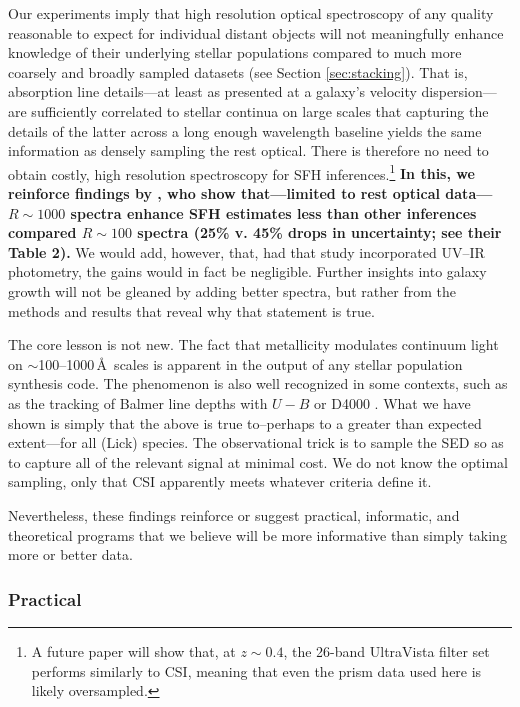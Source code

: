 \documentclass[a4paper,fleqn,usenatbib]{mnras}
\newcommand{\bfr}{\bf\color{red}}
\begin{document}
Our experiments imply that high resolution optical spectroscopy of any quality reasonable
to expect for individual distant objects will not meaningfully 
enhance knowledge of their underlying stellar populations compared to much more coarsely and broadly 
sampled datasets (see Section \ref{sec:stacking}). That is, absorption line 
details---at least as presented at a galaxy's velocity dispersion---are sufficiently correlated to 
stellar continua on large scales that capturing the details 
of the latter across a long enough wavelength baseline yields the same information as 
densely sampling the rest optical. There is therefore no need to obtain 
costly, high resolution spectroscopy for SFH inferences.\footnote{A future 
paper will show that, at $z\sim0.4$, the 26-band UltraVista filter set \citep{Muzzin13} performs 
similarly to CSI, meaning that even the prism data used here is likely oversampled.}
{\bfr In this, we reinforce findings by \citet{Pacifici12}, who show that---limited to 
rest optical data---$R\sim1000$ spectra enhance SFH estimates less than other inferences 
compared $R\sim100$ spectra (25\% v. 45\% drops in uncertainty; see their Table 2).} 
We would add, however, that, had that study incorporated UV--IR photometry, 
the gains would in fact be negligible.
Further insights into galaxy growth will not be gleaned by adding better spectra, but rather
from the methods and results that reveal why that statement is true.

The core lesson is not new. The fact that 
metallicity modulates continuum light on $\sim$100--1000\,\AA\ scales is apparent in the
output of any stellar population synthesis code. The phenomenon is also well recognized in 
some contexts, such as as the tracking of Balmer line depths with $U-B$ or D4000 
\citep[e.g.,][]{Kauffmann03}. What we have shown is simply that the above is true to--perhaps
to a greater than expected extent---for all (Lick) species. The observational trick is to sample the 
SED so as to capture all of the relevant signal at minimal cost. We do not know the optimal sampling,
 only that CSI apparently meets whatever criteria define it.

Nevertheless, these findings reinforce or suggest practical, informatic, and 
theoretical programs that we believe will be more informative than simply taking more or
better data.

\subsubsection{Practical}
\end{document}
